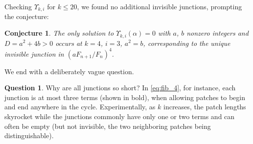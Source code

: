 \documentclass{article}
\numberwithin{equation}{section}
\newtheorem{conj}[thm]{Conjecture}
\theoremstyle{definition}
\newtheorem{qn}[thm]{Question}
\theoremstyle{remark}
\newcommand{\<}{\left\langle}
\renewcommand{\>}{\right\rangle}
\begin{document}
Checking $\Upsilon_{k,i}$ for $k \leq 20$, we found no additional invisible junctions, prompting the conjecture:
\begin{conj}
  The only solution to $\Upsilon_{k,i}(\alpha) = 0$ with $a$, $b$ nonzero integers and $D = a^2 + 4 b > 0$ occurs at $k = 4$, $i = 3$, $a^2 = b$, corresponding to the unique invisible junction in $(aF_{n+1}/F_n)^4$.
\end{conj}

We end with a deliberately vague question.

\begin{qn}
  Why are all junctions so short? In \eqref{eq:fib_4}, for instance, each junction is at most three terms (shown in bold), when allowing patches to begin and end anywhere in the cycle. Experimentally, as $k$ increases, the patch lengths skyrocket while the junctions commonly have only one or two terms and can often be empty (but not invisible, the two neighboring patches being distinguishable).
\end{qn}
\end{document}
